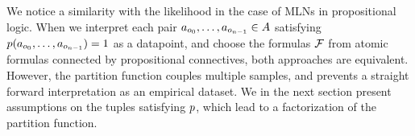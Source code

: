 We notice a similarity with the likelihood in the case of MLNs in propositional logic.
When we interpret each pair $a_{o_{0}},\ldots,a_{o_{n-1}}\in A$ satisfying $p(a_{o_{0}},\ldots,a_{o_{n-1}})=1$ as a datapoint, and choose the formulas $\mathcal{F}$ from atomic formulas connected by propositional connectives, both approaches are equivalent.
However, the partition function couples multiple samples, and prevents a straight forward interpretation as an empirical dataset.
We in the next section present assumptions on the tuples satisfying $p$, which lead to a factorization of the partition function.





	
